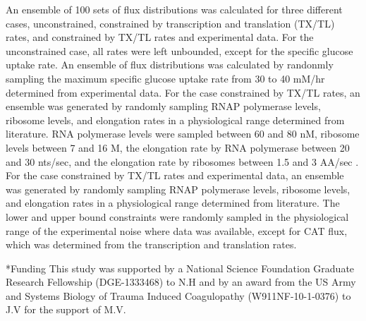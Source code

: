 \documentclass[12pt]{article}
\makeatletter
\renewcommand\section{\@startsection
	{subsection}{2}{0mm}
	{-0.2in}
	{0.05\baselineskip}
	{\normalfont\large\bfseries}}
\makeatother
\begin{document}
An ensemble of 100 sets of flux distributions was calculated for three different cases, unconstrained, constrained by transcription and translation (TX/TL) rates, and  constrained by TX/TL rates and experimental data. 
For the unconstrained case, all rates were left unbounded, except for the specific glucose uptake rate. 
An ensemble of flux distributions was calculated by randonmly sampling the maximum specific glucose uptake rate from 30 to 40 mM/hr determined from experimental data.
For the case constrained by TX/TL rates, an ensemble was generated by randomly sampling RNAP polymerase levels, ribosome levels, and elongation rates in a physiological range determined from literature.
RNA polymerase levels were sampled between 60 and 80 nM, ribosome levels between 7 and 16 \textmu M, the elongation rate by RNA polymerase between 20 and 30 nts/sec, and the elongation rate by ribosomes between 1.5 and 3 AA/sec \cite{2005_underwood_biotech, 2016_garamella_acssynbio}.
For the case constrained by TX/TL rates and experimental data, an ensemble was generated by randomly sampling RNAP polymerase levels, ribosome levels, and elongation rates in a physiological range determined from literature. 
The lower and upper bound constraints were randomly sampled in the physiological range of the experimental noise where data was available, except for CAT flux, which was determined from the transcription and translation rates. 
\clearpage


\section*{Funding}
This study was supported by a National Science Foundation Graduate Research Fellowship (DGE-1333468) to N.H and by an award from the US Army and Systems Biology of Trauma Induced Coagulopathy (W911NF-10-1-0376) to J.V for the support of M.V.

\clearpage



\clearpage
\end{document}
